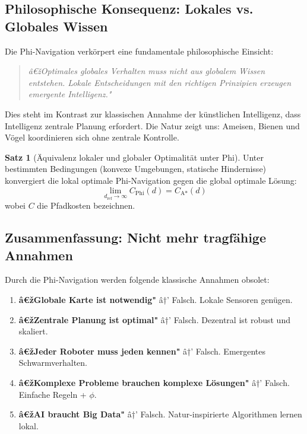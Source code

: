 ﻿\documentclass[a4paper,12pt]{article}
\theoremstyle{definition}
\newtheorem{satz}{Satz}
\begin{document}
\subsection{Philosophische Konsequenz: Lokales vs. Globales Wissen}

Die Phi-Navigation verkörpert eine fundamentale philosophische Einsicht:

\begin{quote}
	\textit{â€žOptimales globales Verhalten muss nicht aus globalem Wissen entstehen. Lokale Entscheidungen mit den richtigen Prinzipien erzeugen emergente Intelligenz."}
\end{quote}

Dies steht im Kontrast zur klassischen Annahme der künstlichen Intelligenz, dass Intelligenz zentrale Planung erfordert. Die Natur zeigt uns: Ameisen, Bienen und Vögel koordinieren sich ohne zentrale Kontrolle.

\begin{satz}[Äquivalenz lokaler und globaler Optimalität unter Phi]
	Unter bestimmten Bedingungen (konvexe Umgebungen, statische Hindernisse) konvergiert die lokal optimale Phi-Navigation gegen die global optimale L\"osung:
	\begin{equation}
	\lim_{d_{\text{ref}} \to \infty} C_{\text{Phi}}(d) = C_{\text{A*}}(d)
	\end{equation}
	wobei $C$ die Pfadkosten bezeichnen.
\end{satz}

\subsection{Zusammenfassung: Nicht mehr tragfähige Annahmen}

Durch die Phi-Navigation werden folgende klassische Annahmen obsolet:

\begin{enumerate}
	\item \textbf{â€žGlobale Karte ist notwendig"} â†’ Falsch. Lokale Sensoren genügen.
	\item \textbf{â€žZentrale Planung ist optimal"} â†’ Falsch. Dezentral ist robust und skaliert.
	\item \textbf{â€žJeder Roboter muss jeden kennen"} â†’ Falsch. Emergentes Schwarmverhalten.
	\item \textbf{â€žKomplexe Probleme brauchen komplexe Lösungen"} â†’ Falsch. Einfache Regeln + $\phi$.
	\item \textbf{â€žAI braucht Big Data"} â†’ Falsch. Natur-inspirierte Algorithmen lernen lokal.
\end{enumerate}
\end{document}
